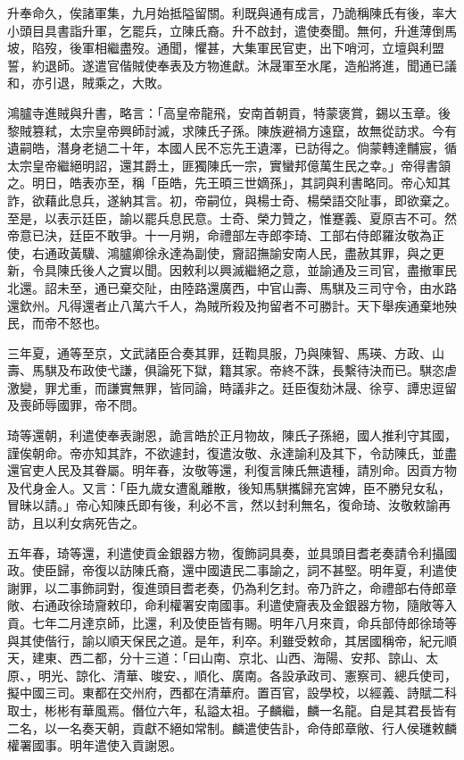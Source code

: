 \begin{pinyinscope}
升奉命久，俟諸軍集，九月始抵隘留關。利既與通有成言，乃詭稱陳氏有後，率大小頭目具書詣升軍，乞罷兵，立陳氏裔。升不啟封，遣使奏聞。無何，升進薄倒馬坡，陷歿，後軍相繼盡歿。通聞，懼甚，大集軍民官吏，出下哨河，立壇與利盟誓，約退師。遂遣官偕賊使奉表及方物進獻。沐晟軍至水尾，造船將進，聞通已議和，亦引退，賊乘之，大敗。

鴻臚寺進賊與升書，略言：「高皇帝龍飛，安南首朝貢，特蒙褒賞，錫以玉章。後黎賊篡弒，太宗皇帝興師討滅，求陳氏子孫。陳族避禍方遠竄，故無從訪求。今有遺嗣皓，潛身老撾二十年，本國人民不忘先王遺澤，已訪得之。倘蒙轉達黼宸，循太宗皇帝繼絕明詔，還其爵土，匪獨陳氏一宗，實蠻邦億萬生民之幸。」帝得書頷之。明日，皓表亦至，稱「臣皓，先王暊三世嫡孫」，其詞與利書略同。帝心知其詐，欲藉此息兵，遂納其言。初，帝嗣位，與楊士奇、楊榮語交阯事，即欲棄之。至是，以表示廷臣，諭以罷兵息民意。士奇、榮力贊之，惟蹇義、夏原吉不可。然帝意已決，廷臣不敢爭。十一月朔，命禮部左寺郎李琦、工部右侍郎羅汝敬為正使，右通政黃驥、鴻臚卿徐永達為副使，齎詔撫諭安南人民，盡赦其罪，與之更新，令具陳氏後人之實以聞。因敕利以興滅繼絕之意，並諭通及三司官，盡撤軍民北還。詔未至，通已棄交阯，由陸路還廣西，中官山壽、馬騏及三司守令，由水路還欽州。凡得還者止八萬六千人，為賊所殺及拘留者不可勝計。天下舉疾通棄地殃民，而帝不怒也。

三年夏，通等至京，文武諸臣合奏其罪，廷鞫具服，乃與陳智、馬瑛、方政、山壽、馬騏及布政使弋謙，俱論死下獄，籍其家。帝終不誅，長繫待決而已。騏恣虐激變，罪尤重，而謙實無罪，皆同論，時議非之。廷臣復劾沐晟、徐亨、譚忠逗留及喪師辱國罪，帝不問。

琦等還朝，利遣使奉表謝恩，詭言皓於正月物故，陳氏子孫絕，國人推利守其國，謹俟朝命。帝亦知其詐，不欲遽封，復遣汝敬、永達諭利及其下，令訪陳氏，並盡還官吏人民及其眷屬。明年春，汝敬等還，利復言陳氏無遺種，請別命。因貢方物及代身金人。又言：「臣九歲女遭亂離散，後知馬騏攜歸充宮婢，臣不勝兒女私，冒昧以請。」帝心知陳氏即有後，利必不言，然以封利無名，復命琦、汝敬敕諭再訪，且以利女病死告之。

五年春，琦等還，利遣使貢金銀器方物，復飾詞具奏，並具頭目耆老奏請令利攝國政。使臣歸，帝復以訪陳氏裔，還中國遺民二事諭之，詞不甚堅。明年夏，利遣使謝罪，以二事飾詞對，復進頭目耆老奏，仍為利乞封。帝乃許之，命禮部右侍郎章敞、右通政徐琦齎敕印，命利權署安南國事。利遣使齎表及金銀器方物，隨敞等入貢。七年二月達京師，比還，利及使臣皆有賜。明年八月來貢，命兵部侍郎徐琦等與其使偕行，諭以順天保民之道。是年，利卒。利雖受敕命，其居國稱帝，紀元順天，建東、西二都，分十三道：「曰山南、京北、山西、海陽、安邦、諒山、太原、，明光、諒化、清華、晙安、，順化、廣南。各設承政司、憲察司、總兵使司，擬中國三司。東都在交州府，西都在清華府。置百官，設學校，以經義、詩賦二科取士，彬彬有華風焉。僭位六年，私謚太祖。子麟繼，麟一名龍。自是其君長皆有二名，以一名奏天朝，貢獻不絕如常制。麟遣使告訃，命侍郎章敞、行人侯璡敕麟權署國事。明年遣使入貢謝恩。


\end{pinyinscope}
